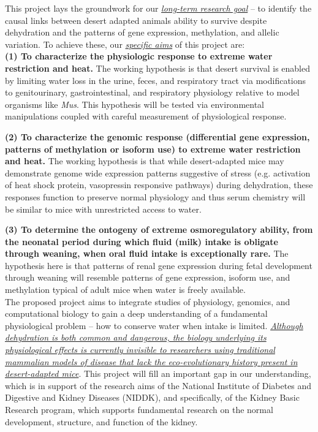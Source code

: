 This project lays the groundwork for our \ul{\emph{long-term research goal}} – to identify the causal links between desert adapted animals ability to survive despite dehydration and the patterns of gene expression, methylation, and allelic variation. To achieve these, our \ul{\emph{specific aims}} of this project are: \\

\noindent \textbf{(1) To characterize the physiologic response to extreme water restriction and heat.} The working hypothesis is that desert survival is enabled by limiting water loss in the urine, feces, and respiratory tract via modifications to genitourinary, gastrointestinal, and respiratory physiology relative to model organisms like \textit{Mus}. This hypothesis will be tested via environmental manipulations coupled with careful measurement of physiological response.

\noindent \textbf{(2) To characterize the genomic response (differential gene expression, patterns of methylation or isoform use) to extreme water restriction and heat.} The working hypothesis is that while desert-adapted mice may demonstrate genome wide expression patterns suggestive of stress (e.g. activation of heat shock protein, vasopressin responsive pathways) during dehydration, these responses function to preserve normal physiology and thus serum chemistry will be similar to mice with unrestricted access to water.

\noindent \textbf{(3) To determine the ontogeny of extreme osmoregulatory ability, from the neonatal period during which fluid (milk) intake is obligate through weaning, when oral fluid intake is exceptionally rare. } The hypothesis here is that patterns of renal gene expression during fetal development through weaning will resemble patterns of gene expression, isoform use, and methylation typical of adult mice when water is freely available. \\


\noindent The proposed project aims to integrate studies of physiology, genomics, and computational biology to gain a deep understanding of a fundamental physiological problem – how to conserve water when intake is limited. \ul{\emph{Although dehydration is both common and dangerous, the biology underlying its physiological effects is currently invisible to researchers using traditional mammalian models of disease that lack the eco-evolutionary history present in desert-adapted mice}}. This project will fill an important gap in our understanding, which is in support of the research aims of the National Institute of Diabetes and Digestive and Kidney Diseases (NIDDK), and specifically, of the Kidney Basic Research program, which supports fundamental research on the normal development, structure, and function of the kidney.

%
























